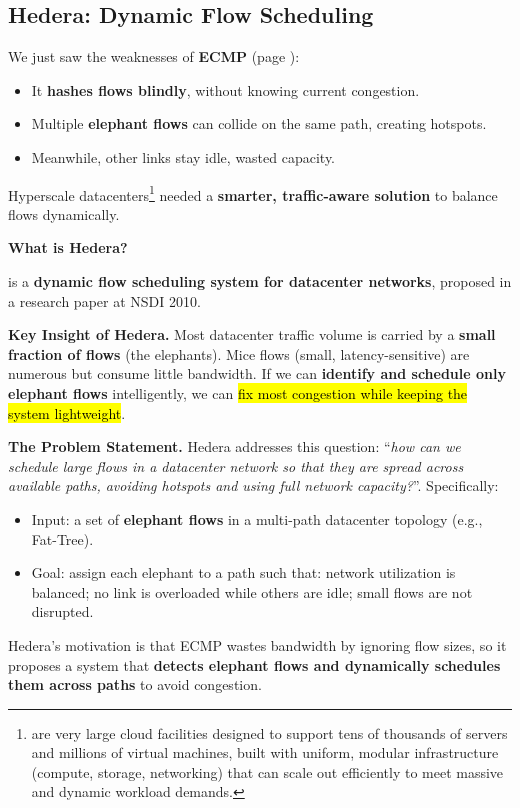 \subsection{Hedera: Dynamic Flow Scheduling}\label{subsection: Hedera - Dynamic Flow Scheduling}

We just saw the weaknesses of \textbf{ECMP} (page \pageref{subsection: Equal Cost Multi Path (ECMP)}):
\begin{itemize}
    \item It \textbf{hashes flows blindly}, without knowing current congestion.
    \item Multiple \textbf{elephant flows} can collide on the same path, creating hotspots.
    \item Meanwhile, other links stay idle, wasted capacity.
\end{itemize}
Hyperscale datacenters\footnote{%
     are very large cloud facilities designed to support tens of thousands of servers and millions of virtual machines, built with uniform, modular infrastructure (compute, storage, networking) that can scale out efficiently to meet massive and dynamic workload demands.
} needed a \textbf{smarter, traffic-aware solution} to balance flows dynamically.

\highspace
\begin{flushleft}
    \textcolor{Green3}{ \textbf{What is Hedera?}}
\end{flushleft}
 is a \textbf{dynamic flow scheduling system for datacenter networks}, proposed in a research paper at NSDI 2010.\cite{al2010hedera}

\highspace
\textcolor{Green3}{ \textbf{Key Insight of Hedera.}} Most datacenter traffic volume is carried by a \textbf{small fraction of flows} (the elephants). Mice flows (small, latency-sensitive) are numerous but consume little bandwidth. If we can \textbf{identify and schedule only elephant flows} intelligently, we can \hl{fix most congestion while keeping the system lightweight}.

\highspace
\textcolor{Red2}{ \textbf{The Problem Statement.}} Hedera addresses this question: ``\emph{how can we schedule large flows in a datacenter network so that they are spread across available paths, avoiding hotspots and using full network capacity?}''. Specifically:
\begin{itemize}
    \item Input: a set of \textbf{elephant flows} in a multi-path datacenter topology (e.g., Fat-Tree).
    \item Goal: assign each elephant to a path such that: network utilization is balanced; no link is overloaded while others are idle; small flows are not disrupted.
\end{itemize}
Hedera's motivation is that ECMP wastes bandwidth by ignoring flow sizes, so it proposes a system that \textbf{detects elephant flows and dynamically schedules them across paths} to avoid congestion.

